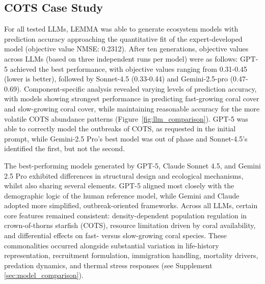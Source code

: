 \subsection{COTS Case Study}
\label{sec:cots_data}
For all tested LLMs, LEMMA was able to generate ecosystem models with prediction accuracy approaching the quantitative fit of the expert-developed model (objective value NMSE: 0.2312). After ten generations, objective values across LLMs (based on three independent runs per model) were as follows: GPT-5 achieved the best performance, with objective values ranging from 0.31-0.45 (lower is better), followed by Sonnet-4.5 (0.33-0.44) and Gemini-2.5-pro (0.47-0.69). Component-specific analysis revealed varying levels of prediction accuracy, with models showing strongest performance in predicting fast-growing coral cover and slow-growing coral cover, while maintaining reasonable accuracy for the more volatile COTS abundance patterns (Figure~\ref{fig:llm_comparison}). GPT-5 was able to correctly model the outbreaks of COTS, as requested in the initial prompt, while Gemini-2.5 Pro's best model was out of phase and Sonnet-4.5's identified the first, but not the second. 

The best-performing models generated by GPT-5, Claude Sonnet 4.5, and Gemini 2.5 Pro exhibited differences in structural design and ecological mechanisms, whilst also sharing several elements. GPT-5 aligned most closely with the demographic logic of the human reference model, while Gemini and Claude adopted more simplified, outbreak-oriented frameworks. Across all LLMs, certain core features remained consistent: density-dependent population regulation in crown-of-thorns starfish (COTS), resource limitation driven by coral availability, and differential effects on fast- versus slow-growing coral species. These commonalities occurred alongside substantial variation in life-history representation, recruitment formulation, immigration handling, mortality drivers, predation dynamics, and thermal stress responses (see Supplement \ref{sec:model_comparison}).

